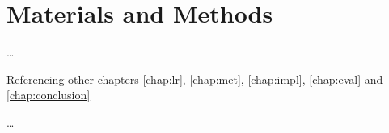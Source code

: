 \chapter{Materials and Methods}
\label{chap:spec}


\ldots

Referencing other chapters \ref{chap:lr}, \ref{chap:met}, \ref{chap:impl}, \ref{chap:eval} and \ref{chap:conclusion}

\ldots